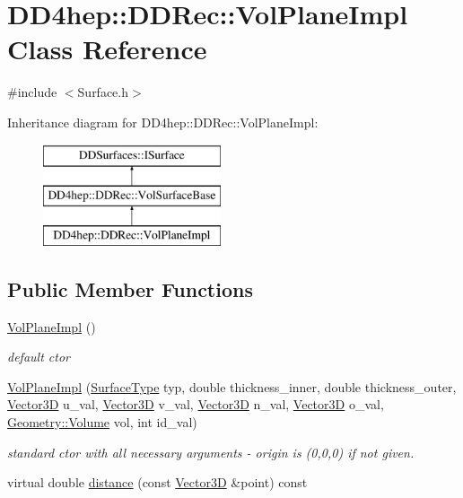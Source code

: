 \hypertarget{class_d_d4hep_1_1_d_d_rec_1_1_vol_plane_impl}{}\section{D\+D4hep\+:\+:D\+D\+Rec\+:\+:Vol\+Plane\+Impl Class Reference}
\label{class_d_d4hep_1_1_d_d_rec_1_1_vol_plane_impl}


{\ttfamily \#include $<$Surface.\+h$>$}

Inheritance diagram for D\+D4hep\+:\+:D\+D\+Rec\+:\+:Vol\+Plane\+Impl\+:\begin{figure}[H]
\begin{center}
\leavevmode
\includegraphics[height=3.000000cm]{class_d_d4hep_1_1_d_d_rec_1_1_vol_plane_impl}
\end{center}
\end{figure}
\subsection*{Public Member Functions}
\begin{DoxyCompactItemize}
\item 
\hyperlink{class_d_d4hep_1_1_d_d_rec_1_1_vol_plane_impl_a37e60d5d920d384a03463e2870293306}{Vol\+Plane\+Impl} ()
\begin{DoxyCompactList}\small\item\em default c\textquotesingle{}tor \end{DoxyCompactList}\item 
\hyperlink{class_d_d4hep_1_1_d_d_rec_1_1_vol_plane_impl_adf4bdd2cb9f2f01e7662f6b0a1cb1379}{Vol\+Plane\+Impl} (\hyperlink{class_d_d_surfaces_1_1_surface_type}{Surface\+Type} typ, double thickness\+\_\+inner, double thickness\+\_\+outer, \hyperlink{class_d_d_surfaces_1_1_vector3_d}{Vector3D} u\+\_\+val, \hyperlink{class_d_d_surfaces_1_1_vector3_d}{Vector3D} v\+\_\+val, \hyperlink{class_d_d_surfaces_1_1_vector3_d}{Vector3D} n\+\_\+val, \hyperlink{class_d_d_surfaces_1_1_vector3_d}{Vector3D} o\+\_\+val, \hyperlink{class_d_d4hep_1_1_geometry_1_1_volume}{Geometry\+::\+Volume} vol, int id\+\_\+val)
\begin{DoxyCompactList}\small\item\em standard c\textquotesingle{}tor with all necessary arguments -\/ origin is (0,0,0) if not given. \end{DoxyCompactList}\item 
virtual double \hyperlink{class_d_d4hep_1_1_d_d_rec_1_1_vol_plane_impl_a5c94e22dfc7011f6ebcf40bae215bf31}{distance} (const \hyperlink{class_d_d_surfaces_1_1_vector3_d}{Vector3D} \&point) const
\end{DoxyCompactItemize}
